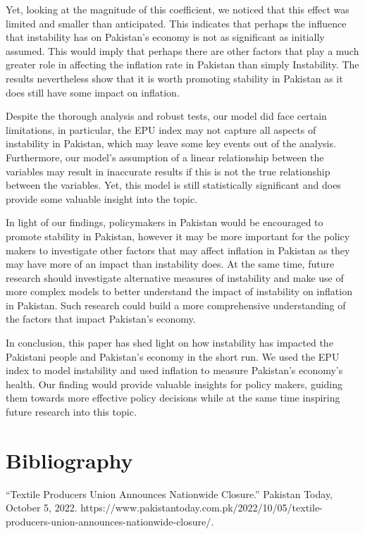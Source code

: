 \documentclass[11pt]{article}
\begin{document}
Yet, looking at the magnitude of this coefficient, we noticed that this effect was limited and smaller than anticipated. This indicates that perhaps the influence that instability has on Pakistan’s economy is not as significant as initially assumed. This would imply that perhaps there are other factors that play a much greater role in affecting the inflation rate in Pakistan than simply Instability. The results nevertheless show that it is worth promoting stability in Pakistan as it does still have some impact on inflation. \newline

Despite the thorough analysis and robust tests, our model did face certain limitations, in particular, the EPU index may not capture all aspects of instability in Pakistan, which may leave some key events out of the analysis. Furthermore, our model’s assumption of a linear relationship between the variables may result in inaccurate results if this is not the true relationship between the variables. Yet, this model is still statistically significant and does provide some valuable insight into the topic. \newline

In light of our findings, policymakers in Pakistan would be encouraged to promote stability in Pakistan, however it may be more important for the policy makers to investigate other factors that may affect inflation in Pakistan as they may have more of an impact than instability does. At the same time, future research should investigate alternative measures of instability and make use of more complex models to better understand the impact of instability on inflation in Pakistan. Such research could build a more comprehensive understanding of the factors that impact Pakistan’s economy. \newline

In conclusion, this paper has shed light on how instability has impacted the Pakistani people and Pakistan’s economy in the short run. We used the EPU index to model instability and used inflation to measure Pakistan’s economy’s health. Our finding would provide valuable insights for policy makers, guiding them towards more effective policy decisions while at the same time inspiring future research into this topic.


\section{Bibliography}
“Textile Producers Union Announces Nationwide Closure.” Pakistan Today, October 5, 2022. https://www.pakistantoday.com.pk/2022/10/05/textile-producers-union-announces-nationwide-closure/. \newline
\end{document}
